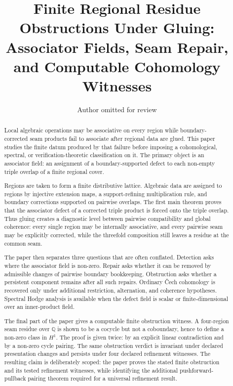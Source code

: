\documentclass[11pt]{article}
\title{Finite Regional Residue Obstructions Under Gluing:\\
Associator Fields, Seam Repair, and Computable Cohomology Witnesses}
\author{Author omitted for review}
\date{}
\newcommand{\Q}{\mathbb{Q}}
\begin{document}
\maketitle

\begin{abstract}
Local algebraic operations may be associative on every region while boundary-corrected seam products fail to associate after regional data are glued. This paper studies the finite datum produced by that failure before imposing a cohomological, spectral, or verification-theoretic classification on it. The primary object is an associator field: an assignment of a boundary-supported defect to each non-empty triple overlap of a finite regional cover.

Regions are taken to form a finite distributive lattice. Algebraic data are assigned to regions by injective extension maps, a support-refining multiplication rule, and boundary corrections supported on pairwise overlaps. The first main theorem proves that the associator defect of a corrected triple product is forced onto the triple overlap. Thus gluing creates a diagnostic level between pairwise compatibility and global coherence: every single region may be internally associative, and every pairwise seam may be explicitly corrected, while the threefold composition still leaves a residue at the common seam.

The paper then separates three questions that are often conflated. Detection asks where the associator field is non-zero. Repair asks whether it can be removed by admissible changes of pairwise boundary bookkeeping. Obstruction asks whether a persistent component remains after all such repairs. Ordinary \v{C}ech cohomology is recovered only under additional restriction, alternation, and coherence hypotheses. Spectral Hodge analysis is available when the defect field is scalar or finite-dimensional over an inner-product field.

The final part of the paper gives a computable finite obstruction witness. A four-region seam residue over \(\Q\) is shown to be a cocycle but not a coboundary, hence to define a non-zero class in \(H^1\). The proof is given twice: by an explicit linear contradiction and by a non-zero cycle pairing. The same obstruction verdict is invariant under declared presentation changes and persists under four declared refinement witnesses. The resulting claim is deliberately scoped: the paper proves the stated finite obstruction and its tested refinement witnesses, while identifying the additional pushforward-pullback pairing theorem required for a universal refinement result.
\end{abstract}
\end{document}
